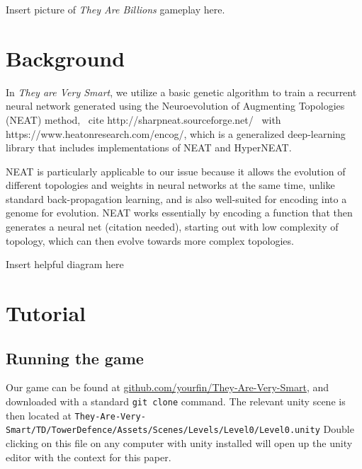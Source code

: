 \documentclass[letterpaper]{article}
\def\tavs{\textit{They are Very Smart}}
\begin{document}
Insert picture of \textit{They Are Billions} gameplay here.

\section{Background}
In \tavs, we utilize a basic genetic algorithm to train a recurrent neural network generated using the Neuroevolution of Augmenting Topologies (NEAT) method, ~cite http://sharpneat.sourceforge.net/~ with https://www.heatonresearch.com/encog/, which is a generalized deep-learning library that includes implementations of NEAT and HyperNEAT.

NEAT is particularly applicable to our issue because it allows the evolution of different topologies and weights in neural networks at the same time, unlike standard back-propagation learning, and is also well-suited for encoding into a genome for evolution. NEAT works essentially by encoding a function that then generates a neural net (citation needed), starting out with low complexity of topology, which can then evolve towards more complex topologies.

Insert helpful diagram here




\section{Tutorial}

\subsection{Running the game}
Our game can be found at
\href{https://github.com/YourFin/They-Are-Very-Smart}{github.com/yourfin/They-Are-Very-Smart},
and downloaded with a standard \texttt{git clone} command. The relevant unity
scene is then located at
\texttt{They-Are-Very-Smart/TD/TowerDefence/Assets/Scenes/Levels/Level0/Level0.unity}
Double clicking on this file on any computer with unity installed will open up
the unity editor with the context for this paper.
\end{document}
